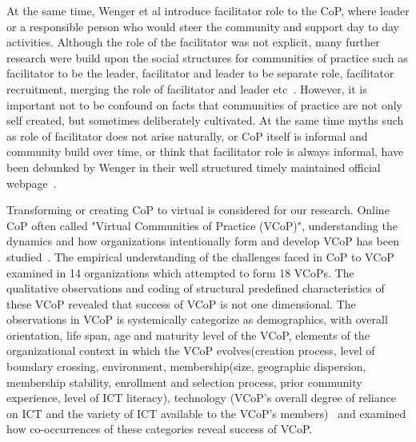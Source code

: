 \documentclass[manuscript,screen,review]{acmart}
\begin{document}
At the same time, Wenger et al introduce facilitator role to the CoP, where leader or a responsible person who would steer the community and support day to day activities. Although the role of the facilitator was not explicit, many further research were build upon the social structures for communities of practice such as facilitator to be the leader, facilitator and leader to be separate role, facilitator recruitment, merging the role of facilitator and leader etc~\cite{tarmizi2005facilitation}. However, it is important not to be confound on facts that communities of practice are not only self created, but sometimes deliberately cultivated. At the same time myths such as role of facilitator does not arise naturally,  or CoP itself is informal and community build over time,  or think that facilitator role is  always informal, have been debunked by Wenger in their well structured timely maintained official webpage~\cite{Wenger@site}.  


Transforming or creating CoP to virtual is considered for our research. Online CoP often called "Virtual Communities of Practice (VCoP)", understanding the dynamics and how organizations
intentionally form and develop VCoP has been studied~\cite{dube2005impact}. The empirical understanding of the challenges faced in CoP to VCoP examined in 14 organizations which attempted to form 18 VCoPs. The qualitative observations and coding of structural predefined characteristics of these VCoP revealed that success of VCoP is not one dimensional. The observations in VCoP is systemically categorize as demographics,
with overall orientation, life span, age and maturity level of the VCoP, elements of the organizational context in which the VCoP evolves(creation process, level of boundary crossing, environment, membership(size, geographic dispersion, membership stability,
enrollment and selection process, prior community experience, level of ICT literacy), technology (VCoP’s overall degree of reliance on ICT and the variety of ICT available to the VCoP’s members)~\cite{dube2003towards} and examined how co-occurrences of these categories reveal success of VCoP. 
\end{document}
